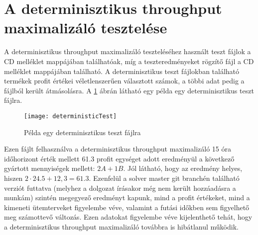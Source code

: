\section{A determinisztikus throughput maximalizáló tesztelése}
A determinisztikus throughput maximalizáló teszteléséhez használt teszt fájlok a CD melléklet   mappájában találhatóak, míg a teszteredményeket rögzítő  fájl a CD melléklet  mappájában található.
A determinisztikus teszt fájlokban található termékek profit értékei véletlenszerűen választott számok, a többi adat pedig a  fájlból került átmásolásra.
A \ref{deterministic_test} ábrán látható egy példa egy determinisztikus teszt fájlra.
\begin{figure}[H]
\begin{center}
\texttt{[image: deterministicTest]}
\caption{Példa egy determinisztikus teszt fájlra}
\label{deterministic_test}
\end{center}
\end{figure}
Ezen fájlt felhasználva a determinisztikus throughput maximalizáló 15 óra időhorizont érték mellett 61.3 profit egységet adott eredményül a következő gyártott mennyiségek mellett: $2A+1B$.
Jól látható, hogy az eredmény helyes, hiszen $2 \cdot 24.5 +12,3=61.3$.
Ezenfelül a solver master git branchén található verziót futtatva (melyhez a dolgozat írásakor még nem került hozzáadásra a munkám) szintén megegyező eredményt kapunk, mind a profit értékeket, mind a kimeneti ütemterveket figyelembe véve, valamint a futási időkben sem figyelhető meg számottevő változás.
Ezen adatokat figyelembe véve kijelenthető tehát, hogy a determinisztikus throughput maximalizáló továbbra is hibátlanul működik.     
